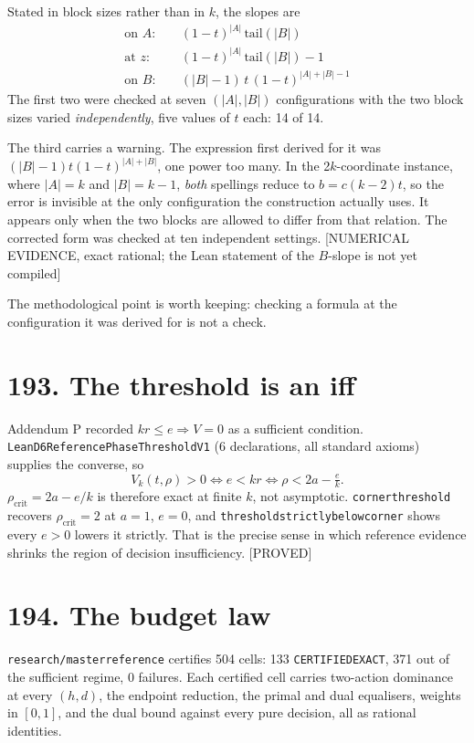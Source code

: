 \documentclass[9pt,twocolumn]{article}
\newcommand{\eclass}[1]{\textsf{[#1]}}
\renewcommand{\_}{\CIGunderscore\allowbreak}
\begin{document}
Stated in block sizes rather than in $k$, the slopes are
\begin{align*}
\text{on } A:&\quad (1-t)^{|A|}\,\mathrm{tail}(|B|)\\
\text{at } z:&\quad (1-t)^{|A|}\,\mathrm{tail}(|B|)-1\\
\text{on } B:&\quad (|B|-1)\,t\,(1-t)^{|A|+|B|-1}
\end{align*}
The first two were checked at seven $(|A|,|B|)$ configurations with the two block sizes varied \emph{independently}, five values of $t$ each: 14 of 14.

The third carries a warning. The expression first derived for it was $(|B|-1)t(1-t)^{|A|+|B|}$, one power too many. In the 2$k$-coordinate instance, where $|A|=k$ and $|B|=k-1$, \emph{both} spellings reduce to $b=c(k-2)t$, so the error is invisible at the only configuration the construction actually uses. It appears only when the two blocks are allowed to differ from that relation. The corrected form was checked at ten independent settings. \eclass{NUMERICAL EVIDENCE, exact rational; the Lean statement of the $B$-slope is not yet compiled}

The methodological point is worth keeping: checking a formula at the configuration it was derived for is not a check.

\section*{193. The threshold is an iff}

Addendum P recorded $kr\le e\Rightarrow V=0$ as a sufficient condition. \texttt{LeanD6ReferencePhaseThresholdV1} (6 declarations, all standard axioms) supplies the converse, so
\[ V_k(t,\rho)>0 \iff e<kr \iff \rho<2a-\tfrac{e}{k}. \]
$\rho_{\mathrm{crit}}=2a-e/k$ is therefore exact at finite $k$, not asymptotic. \texttt{corner\_threshold} recovers $\rho_{\mathrm{crit}}=2$ at $a=1$, $e=0$, and \texttt{threshold\_strictly\_below\_corner} shows every $e>0$ lowers it strictly. That is the precise sense in which reference evidence shrinks the region of decision insufficiency. \eclass{PROVED}

\section*{194. The budget law}

\texttt{research/master\_reference\_20260912} certifies 504 cells: 133 \texttt{CERTIFIED\_EXACT}, 371 out of the sufficient regime, 0 failures. Each certified cell carries two-action dominance at every $(h,d)$, the endpoint reduction, the primal and dual equalisers, weights in $[0,1]$, and the dual bound against every pure decision, all as rational identities.
\end{document}
